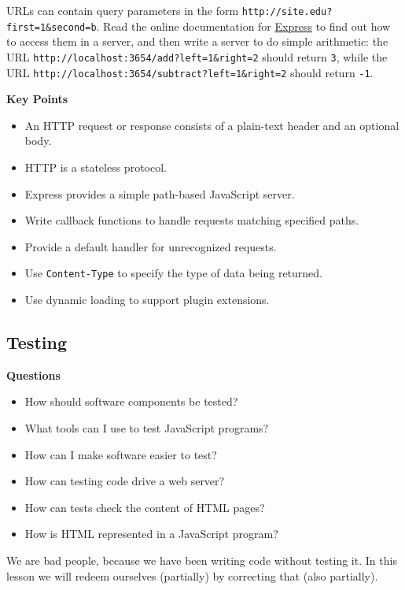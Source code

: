 URLs can contain query parameters in the form
\texttt{http://site.edu?first=1\&second=b}. Read the online
documentation for \href{https://expressjs.org/}{Express} to find out how
to access them in a server, and then write a server to do simple
arithmetic: the URL \texttt{http://localhost:3654/add?left=1\&right=2}
should return \texttt{3}, while the URL
\texttt{http://localhost:3654/subtract?left=1\&right=2} should return
\texttt{-1}.

\textbf{Key Points}

\begin{itemize}
\tightlist
\item
  An HTTP request or response consists of a plain-text header and an
  optional body.
\item
  HTTP is a stateless protocol.
\item
  Express provides a simple path-based JavaScript server.
\item
  Write callback functions to handle requests matching specified paths.
\item
  Provide a default handler for unrecognized requests.
\item
  Use \texttt{Content-Type} to specify the type of data being returned.
\item
  Use dynamic loading to support plugin extensions.
\end{itemize}

\hypertarget{s:testing}{\subsection{Testing}\label{s:testing}}

\textbf{Questions}

\begin{itemize}
\tightlist
\item
  How should software components be tested?
\item
  What tools can I use to test JavaScript programs?
\item
  How can I make software easier to test?
\item
  How can testing code drive a web server?
\item
  How can tests check the content of HTML pages?
\item
  How is HTML represented in a JavaScript program?
\end{itemize}

We are bad people, because we have been writing code without testing it.
In this lesson we will redeem ourselves (partially) by correcting that
(also partially).

